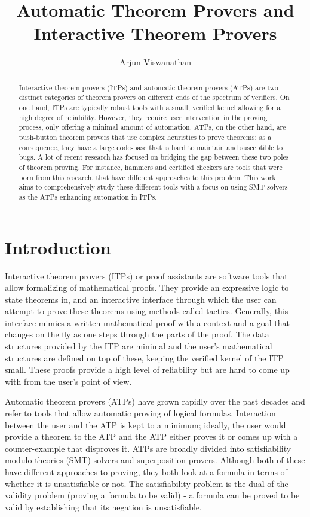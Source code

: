 \documentclass{article}
\begin{document}
\title{Automatic Theorem Provers and Interactive Theorem Provers}
\author{Arjun Viswanathan}
\date{}
\maketitle
\begin{abstract}
	Interactive theorem provers (ITPs) and automatic theorem provers (ATPs)
	are two distinct categories of theorem provers on different ends 
	of the spectrum of verifiers. On one hand, 
	ITPs are typically robust tools with a small, verified kernel 
	allowing for a high degree of reliability. However, they 
	require user intervention in the proving process, only
	offering a minimal amount of automation. ATPs, on the other hand, 
	are push-button theorem provers that use complex heuristics to prove 
	theorems; as a consequence, they have a large code-base that is hard 
	to maintain and susceptible to bugs. A lot of recent research 
	has focused on bridging the gap between these two poles 
	of theorem proving. For instance, hammers and certified checkers 
	are tools that were born from this research, that have different 
	approaches to this problem. This work aims to 
	comprehensively study these different tools 
	with a focus on using SMT solvers as
	the ATPs enhancing automation in ITPs.
\end{abstract}

\section{Introduction}
\label{sec:intro}
	Interactive theorem provers (ITPs) or proof assistants are 
	software tools that allow formalizing of mathematical proofs.
	They provide an expressive logic to state theorems in, and 
	an interactive interface through which the user can 
	attempt to prove these theorems using methods 
	called tactics. Generally, this interface mimics a 
	written mathematical proof with a context and a goal 
	that changes on the fly as one steps through the parts 
	of the proof. The data structures provided by the ITP are 
	minimal and the user's mathematical structures are 
	defined on top of these, keeping the verified kernel of the 
	ITP small. These proofs provide a high level of reliability
	but are hard to come up with from the user's point of view. 
	
	Automatic theorem provers (ATPs) have grown rapidly over the 
	past decades and refer to tools that allow automatic proving 
	of logical formulas. Interaction between the user and the 
	ATP is kept to a minimum; ideally, the user would provide a 
	theorem to the ATP and the ATP either proves it or comes up
	with a counter-example that disproves it. ATPs are broadly divided into satisfiability modulo theories 
	(SMT)-solvers and superposition provers. Although both 
	of these have different approaches to proving, they 
	both look at a formula in terms of whether it is 
	unsatisfiable or not. The satisfiability problem 
	is the dual of the validity problem (proving a 
	formula to be valid) - a formula can be proved to be 
	valid by establishing that its negation is 
	unsatisfiable.
	
\end{document}
